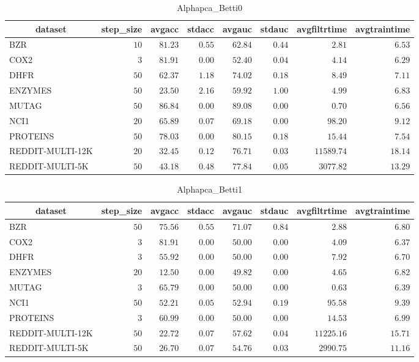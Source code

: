 \begin{table}[!tbp]
\caption{Alphapca_Betti0\label{Alphapca_Betti0}} 
{\centering
\begin{tabular}{lrrrrrrr}
\hline\hline
\multicolumn{1}{c}{dataset}&\multicolumn{1}{c}{step_size}&\multicolumn{1}{c}{avgacc}&\multicolumn{1}{c}{stdacc}&\multicolumn{1}{c}{avgauc}&\multicolumn{1}{c}{stdauc}&\multicolumn{1}{c}{avgfiltrtime}&\multicolumn{1}{c}{avgtraintime}\tabularnewline
\hline
BZR&$10$&$81.23$&$0.55$&$62.84$&$0.44$&$    2.81$&$ 6.53$\tabularnewline
COX2&$ 3$&$81.91$&$0.00$&$52.40$&$0.04$&$    4.14$&$ 6.29$\tabularnewline
DHFR&$50$&$62.37$&$1.18$&$74.02$&$0.18$&$    8.49$&$ 7.11$\tabularnewline
ENZYMES&$50$&$23.50$&$2.16$&$59.92$&$1.00$&$    4.99$&$ 6.83$\tabularnewline
MUTAG&$50$&$86.84$&$0.00$&$89.08$&$0.00$&$    0.70$&$ 6.56$\tabularnewline
NCI1&$20$&$65.89$&$0.07$&$69.18$&$0.00$&$   98.20$&$ 9.12$\tabularnewline
PROTEINS&$50$&$78.03$&$0.00$&$80.15$&$0.18$&$   15.44$&$ 7.54$\tabularnewline
REDDIT-MULTI-12K&$20$&$32.45$&$0.12$&$76.71$&$0.03$&$11589.74$&$18.14$\tabularnewline
REDDIT-MULTI-5K&$50$&$43.18$&$0.48$&$77.84$&$0.05$&$ 3077.82$&$13.29$\tabularnewline
\hline
\end{tabular}}
\end{table}
\begin{table}[!tbp]
\caption{Alphapca_Betti1\label{Alphapca_Betti1}} 
{\centering
\begin{tabular}{lrrrrrrr}
\hline\hline
\multicolumn{1}{c}{dataset}&\multicolumn{1}{c}{step_size}&\multicolumn{1}{c}{avgacc}&\multicolumn{1}{c}{stdacc}&\multicolumn{1}{c}{avgauc}&\multicolumn{1}{c}{stdauc}&\multicolumn{1}{c}{avgfiltrtime}&\multicolumn{1}{c}{avgtraintime}\tabularnewline
\hline
BZR&$50$&$75.56$&$0.55$&$71.07$&$0.84$&$    2.88$&$ 6.80$\tabularnewline
COX2&$ 3$&$81.91$&$0.00$&$50.00$&$0.00$&$    4.09$&$ 6.37$\tabularnewline
DHFR&$ 3$&$55.92$&$0.00$&$50.00$&$0.00$&$    7.92$&$ 6.70$\tabularnewline
ENZYMES&$20$&$12.50$&$0.00$&$49.82$&$0.00$&$    4.65$&$ 6.82$\tabularnewline
MUTAG&$ 3$&$65.79$&$0.00$&$50.00$&$0.00$&$    0.63$&$ 6.39$\tabularnewline
NCI1&$50$&$52.21$&$0.05$&$52.94$&$0.19$&$   95.58$&$ 9.39$\tabularnewline
PROTEINS&$ 3$&$60.99$&$0.00$&$50.00$&$0.00$&$   14.53$&$ 6.99$\tabularnewline
REDDIT-MULTI-12K&$50$&$22.72$&$0.07$&$57.62$&$0.04$&$11225.16$&$15.71$\tabularnewline
REDDIT-MULTI-5K&$50$&$26.70$&$0.07$&$54.76$&$0.03$&$ 2990.75$&$11.16$\tabularnewline
\hline
\end{tabular}}
\end{table}
